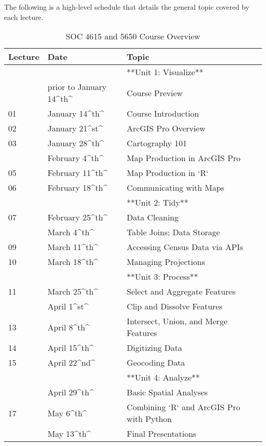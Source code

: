 \documentclass[]{book}
\begin{document}
The following is a high-level schedule that details the general topic covered by each lecture.

\begin{table}[t]

\caption{\label{tab:unnamed-chunk-1}SOC 4615 and 5650 Course Overview}
\centering
\begin{tabular}{lll}
\toprule
Lecture & Date & Topic\\
\midrule
 &  & **Unit 1: Visualize**\\
 & prior to January 14\textasciicircum{}th\textasciicircum{} & Course Preview\\
01 & January 14\textasciicircum{}th\textasciicircum{} & Course Introduction\\
02 & January 21\textasciicircum{}st\textasciicircum{} & ArcGIS Pro Overview\\
03 & January 28\textasciicircum{}th\textasciicircum{} & Cartography 101\\
\addlinespace
04 & February 4\textasciicircum{}th\textasciicircum{} & Map Production in ArcGIS Pro\\
05 & February 11\textasciicircum{}th\textasciicircum{} & Map Production in `R`\\
06 & February 18\textasciicircum{}th\textasciicircum{} & Communicating with Maps\\
 &  & **Unit 2: Tidy**\\
07 & February 25\textasciicircum{}th\textasciicircum{} & Data Cleaning\\
\addlinespace
08 & March 4\textasciicircum{}th\textasciicircum{} & Table Joins; Data Storage\\
09 & March 11\textasciicircum{}th\textasciicircum{} & Accessing Census Data via APIs\\
10 & March 18\textasciicircum{}th\textasciicircum{} & Managing Projections\\
 &  & **Unit 3: Process**\\
11 & March 25\textasciicircum{}th\textasciicircum{} & Select and Aggregate Features\\
\addlinespace
12 & April 1\textasciicircum{}st\textasciicircum{} & Clip and Dissolve Features\\
13 & April 8\textasciicircum{}th\textasciicircum{} & Intersect, Union, and Merge Features\\
14 & April 15\textasciicircum{}th\textasciicircum{} & Digitizing Data\\
15 & April 22\textasciicircum{}nd\textasciicircum{} & Geocoding Data\\
 &  & **Unit 4: Analyze**\\
\addlinespace
16 & April 29\textasciicircum{}th\textasciicircum{} & Basic Spatial Analyses\\
17 & May 6\textasciicircum{}th\textasciicircum{} & Combining `R` and ArcGIS Pro with Python\\
 & May 13\textasciicircum{}th\textasciicircum{} & Final Presentations\\
\bottomrule
\end{tabular}
\end{table}
\end{document}
